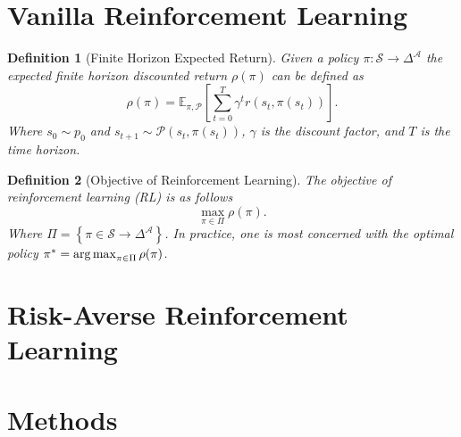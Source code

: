 \documentclass[10pt]{article}
\newtheorem{definition}{Definition}
\theoremstyle{plain}
\theoremstyle{remark}
\begin{document}
\section{Vanilla Reinforcement Learning}

\begin{definition}[Finite Horizon Expected Return]
        Given a policy $\pi : \mathcal{S} \to \Delta^\mathcal{A}$ the expected finite horizon discounted return $\rho(\pi)$ can be defined as
        $$\rho(\pi) = \mathbb{E}_{\pi, \mathcal{P}} \left[ \sum_{t=0}^{T} \gamma^t r(s_t, \pi(s_t)) \right].$$
        Where $s_0 \sim p_0$ and $s_{t+1} \sim \mathcal{P}(s_t, \pi(s_t))$, $\gamma$ is the discount factor, and $T$ is the time horizon.
\end{definition}

\begin{definition}[Objective of Reinforcement Learning]
        \label{def:rl_obj}
        The objective of reinforcement learning (RL) is as follows
        $$\max_{\pi \in \Pi} \rho(\pi).$$
        Where $\Pi = \left\{ \pi \in \mathcal{S} \to \Delta^\mathcal{A}  \right\}$.
        In practice, one is most concerned with the optimal policy $\pi^* = \operatorname*{arg\,max}_{\pi \in \Pi} \rho(\pi)$.
\end{definition}

\section{Risk-Averse Reinforcement Learning}

\section{Methods}
\end{document}
